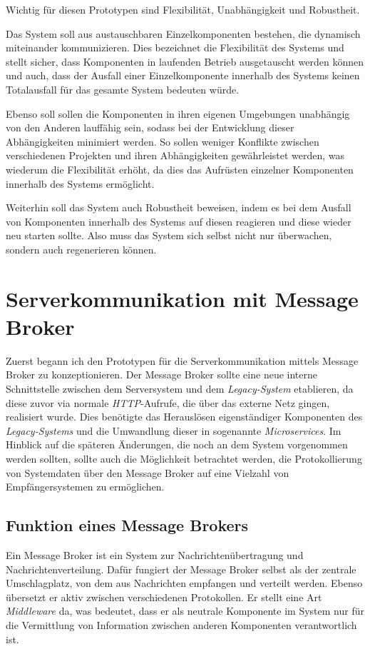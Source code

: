 \documentclass[12pt,a4paper]{scrartcl}
\begin{document}
Wichtig für diesen Prototypen sind Flexibilität, Unabhängigkeit und Robustheit.

Das System soll aus austauschbaren Einzelkomponenten bestehen, die dynamisch miteinander kommunizieren. Dies bezeichnet die Flexibilität des Systems und stellt sicher, dass Komponenten in laufenden Betrieb ausgetauscht werden können und auch, dass der Ausfall einer Einzelkomponente innerhalb des Systems keinen Totalausfall für das gesamte System bedeuten würde.

Ebenso soll sollen die Komponenten in ihren eigenen Umgebungen unabhängig von den Anderen lauffähig sein, sodass bei der Entwicklung dieser Abhängigkeiten minimiert werden. So sollen weniger Konflikte zwischen verschiedenen Projekten und ihren Abhängigkeiten gewährleistet werden, was wiederum die Flexibilität erhöht, da dies das Aufrüsten einzelner Komponenten innerhalb des Systems ermöglicht.

Weiterhin soll das System auch Robustheit beweisen, indem es bei dem Ausfall von Komponenten innerhalb des Systems auf diesen reagieren und diese wieder neu starten sollte. Also muss das System sich selbst nicht nur überwachen, sondern auch regenerieren können. 

\newpage
\section{Serverkommunikation mit Message Broker} \label{rabbit}
Zuerst begann ich den Prototypen für die Serverkommunikation mittels Message Broker zu konzeptionieren. Der Message Broker sollte eine neue interne Schnittstelle zwischen dem Serversystem und dem \emph{Legacy-System} etablieren, da diese zuvor via normale \emph{HTTP}-Aufrufe, die über das externe Netz gingen, realisiert wurde. Dies benötigte das Herauslösen eigenständiger Komponenten des \emph{Legacy-Systems} und die Umwandlung dieser in sogenannte \emph{\Gls{Microservices}}. Im Hinblick auf die späteren Änderungen, die noch an dem System vorgenommen werden sollten, sollte auch die Möglichkeit betrachtet werden, die Protokollierung von Systemdaten über den Message Broker auf eine Vielzahl von Empfängersystemen zu ermöglichen.

\subsection{Funktion eines Message Brokers}
Ein Message Broker ist ein System zur Nachrichtenübertragung und Nachrichtenverteilung. Dafür fungiert der Message Broker selbst als der zentrale Umschlagplatz, von dem aus Nachrichten empfangen und verteilt werden. Ebenso übersetzt er aktiv zwischen verschiedenen Protokollen\cite{mesBro}. Er stellt eine Art \emph{\Gls{Middleware}} da, was bedeutet, dass er als neutrale Komponente im System nur für die Vermittlung von Information zwischen anderen Komponenten verantwortlich ist.
\end{document}
